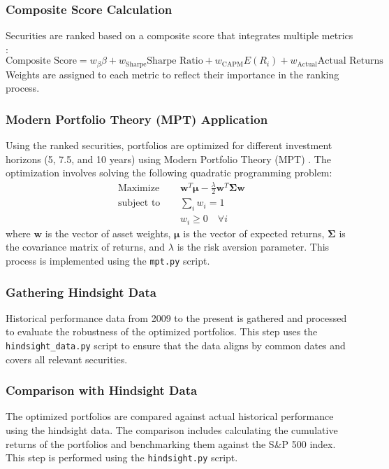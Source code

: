 \subsubsection{Composite Score Calculation}
Securities are ranked based on a composite score that integrates multiple metrics \citep{jones1992investments}:
\begin{equation}
    \text{Composite Score} = w_{\beta} \beta + w_{\text{Sharpe}} \text{Sharpe Ratio} + w_{\text{CAPM}} E(R_i) + w_{\text{Actual}} \text{Actual Returns}
\end{equation}
Weights are assigned to each metric to reflect their importance in the ranking process.

\subsubsection{Modern Portfolio Theory (MPT) Application}
Using the ranked securities, portfolios are optimized for different investment horizons (5, 7.5, and 10 years) using Modern Portfolio Theory (MPT) \citep{markowitz1952portfolio}. The optimization involves solving the following quadratic programming problem:
\begin{align}
    \text{Maximize } & \quad \mathbf{w}^T \mathbf{\mu} - \frac{\lambda}{2} \mathbf{w}^T \mathbf{\Sigma} \mathbf{w} \\
    \text{subject to} & \quad \sum_{i} w_i = 1 \\
    & \quad w_i \geq 0 \quad \forall i
\end{align}
where \(\mathbf{w}\) is the vector of asset weights, \(\mathbf{\mu}\) is the vector of expected returns, \(\mathbf{\Sigma}\) is the covariance matrix of returns, and \(\lambda\) is the risk aversion parameter. This process is implemented using the \texttt{mpt.py} script.

\subsubsection{Gathering Hindsight Data}
Historical performance data from 2009 to the present is gathered and processed to evaluate the robustness of the optimized portfolios. This step uses the \texttt{hindsight\_data.py} script to ensure that the data aligns by common dates and covers all relevant securities.

\subsubsection{Comparison with Hindsight Data}
The optimized portfolios are compared against actual historical performance using the hindsight data. The comparison includes calculating the cumulative returns of the portfolios and benchmarking them against the S\&P 500 index. This step is performed using the \texttt{hindsight.py} script.

